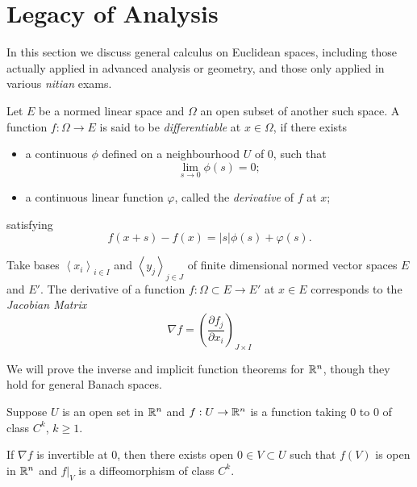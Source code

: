 \section{Legacy of Analysis}

In this section we discuss general calculus on Euclidean spaces, including those actually applied in advanced analysis or geometry, and those only applied in various \emph{nitian} exams.

\begin{definition}
    Let $E$ be a normed linear space and $\Omega$ an open subset of another such space. A function $f:\Omega\to E$ is said to be \emph{differentiable} at $x\in\Omega$, if there exists
    \begin{itemize}
        \item a continuous $\phi$ defined on a  neighbourhood $U$ of $0$, such that
        $$\lim_{s\to 0}\phi(s)=0;$$
        \item a continuous linear function $\varphi$, called the \emph{derivative} of $f$ at $x$;
    \end{itemize}
    satisfying
    $$f(x+s)-f(x)=|s|\phi(s)+\varphi(s).$$
\end{definition}

Take bases $\left\langle x_i\right\rangle_{i\in I}$ and $\left\langle y_j\right\rangle_{j\in J}$ of finite dimensional normed vector spaces $E$ and $E'$.
The derivative of a function $f:\Omega\subset E\to E'$ at $x\in E$ corresponds to the \emph{Jacobian Matrix}
$$\nabla f=\left(\frac{\partial f_j}{\partial x_i}\right)_{J\times I}$$

We will prove the inverse and implicit function theorems for $\mathbb{R}^n$, though they hold for general Banach spaces.

\begin{theorem}\label{thm.invfunc}
    Suppose $U$ is an open set in $\mathbb{R}^n$ and $f:U\to\mathbb{R}^n$ is a function taking $0$ to $0$ of class $C^k$, $k\geq 1$. 
    
    If $\nabla f$ is invertible at $0$, then there exists open $0\in V\subset U$ such that $f(V)$ is open in $\mathbb{R}^n$ and $f|_V$ is a diffeomorphism of class $C^k$.   
\end{theorem}

